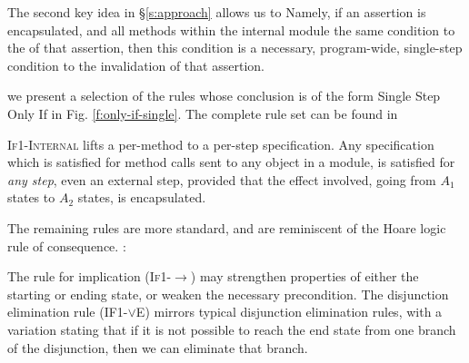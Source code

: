 {The second key idea in \S \ref{s:approach}} allows us to
Namely, if an assertion is encapsulated, and all methods within the internal module
 the same condition to the  of that assertion, then 
this condition is a necessary, program-wide, single-step condition   to the invalidation of that assertion.

 we present a selection of the rules whose conclusion is of the form Single Step Only If in Fig. \ref{f:only-if-single}.
 The complete rule set can be found in  %

\textsc{If1-Internal} 
 lifts a  per-method \Nec {} to a per-step \Nec specification.
Any \Nec specification which is satisfied for  method
calls sent to any object in a module, is satisfied for \emph{any step}, even
an external step, provided that the effect involved, \ie going from $A_1$ states to
$A_2$ states, is encapsulated.

 The remaining rules are more standard, and are reminiscent of the Hoare logic rule of consequence.
:
 
The  rule for implication (\textsc{If1-$\longrightarrow$}) may strengthen
 properties of either the starting or ending state, or 
weaken the necessary precondition. 
%
%
The disjunction
elimination rule (\textsc{IF1-$\vee$E}) mirrors typical disjunction elimination
rules, with a variation stating that if it is not possible  to reach 
the end state from one branch of the disjunction, then we can eliminate 
that branch. 

